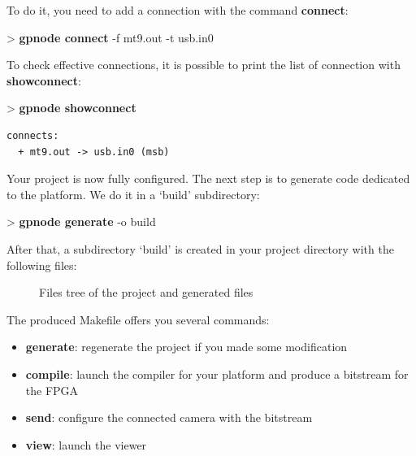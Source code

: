 \documentclass[10pt,a4paper]{article}
\begin{document}
To do it, you need to add a connection with the command \textbf{connect}:
\begin{sample}
> \textbf{gpnode connect} -f mt9.out -t usb.in0
\end{sample}

To check effective connections, it is possible to print the list of connection with \textbf{showconnect}:
\begin{sample}
> \textbf{gpnode showconnect}
\begin{Verbatim}
connects:
  + mt9.out -> usb.in0 (msb)
\end{Verbatim}
\end{sample}

Your project is now fully configured. The next step is to generate code dedicated to the platform. We do it in a `build' subdirectory:

\begin{sample}
> \textbf{gpnode generate} -o build
\end{sample}

After that, a subdirectory `build' is created in your project directory with the following files:

\begin{figure}[h]
\caption{Files tree of the project and generated files}
\label{fig:archivetree}
\end{figure}

The produced Makefile offers you several commands:
\begin{itemize}
\item \textbf{generate}: regenerate the project if you made some modification
\item \textbf{compile}: launch the compiler for your platform and produce a bitstream for the FPGA
\item \textbf{send}: configure the connected camera with the bitstream
\item \textbf{view}: launch the viewer
\end{itemize}
\end{document}
